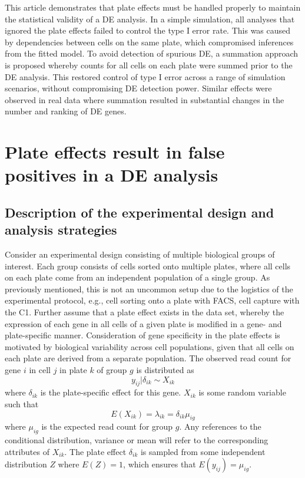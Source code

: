 \documentclass[oupdraft]{bio}
\begin{document}
This article demonstrates that plate effects must be handled properly to maintain the statistical validity of a DE analysis.
In a simple simulation, all analyses that ignored the plate effects failed to control the type I error rate.
This was caused by dependencies between cells on the same plate, which compromised inferences from the fitted model.
To avoid detection of spurious DE, a summation approach is proposed whereby counts for all cells on each plate were summed prior to the DE analysis.
This restored control of type I error across a range of simulation scenarios, without compromising DE detection power.
Similar effects were observed in real data where summation resulted in substantial changes in the number and ranking of DE genes.

\section{Plate effects result in false positives in a DE analysis}

\subsection{Description of the experimental design and analysis strategies}
Consider an experimental design consisting of multiple biological groups of interest.
Each group consists of cells sorted onto multiple plates, where all cells on each plate come from an independent population of a single group.
As previously mentioned, this is not an uncommon setup due to the logistics of the experimental protocol, e.g., cell sorting onto a plate with FACS, cell capture with the C1.
Further assume that a plate effect exists in the data set, whereby the expression of each gene in all cells of a given plate is modified in a gene- and plate-specific manner.
Consideration of gene specificity in the plate effects is motivated by biological variability across cell populations, 
    given that all cells on each plate are derived from a separate population.
The observed read count for gene $i$ in cell $j$ in plate $k$ of group $g$ is distributed as 
\[
    y_{ij} | \delta_{ik}  \sim X_{ik}
\]
where $\delta_{ik}$ is the plate-specific effect for this gene.
$X_{ik}$ is some random variable such that 
\[
    E(X_{ik}) = \lambda_{ik} = \delta_{ik}\mu_{ig}
\]
where $\mu_{ig}$ is the expected read count for group $g$. 
Any references to the conditional distribution, variance or mean will refer to the corresponding attributes of $X_{ik}$.
The plate effect $\delta_{ik}$ is sampled from some independent distribution $Z$ where $E(Z) = 1$, which ensures that $E(y_{ij}) = \mu_{ig}$.
\end{document}
